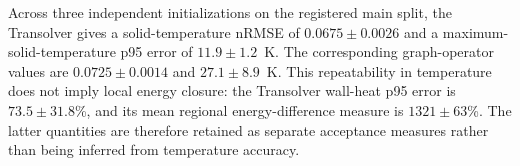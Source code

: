 Across three independent initializations on the registered main split, the 
Transolver gives a solid-temperature nRMSE of $0.0675 \pm 0.0026$ and a maximum-solid-temperature p95 error of $11.9 \pm 1.2$~K.  The corresponding graph-operator values are $0.0725 \pm 0.0014$ and $27.1 \pm 8.9$~K.
This repeatability in temperature does not imply local energy closure: the Transolver wall-heat p95 error is $73.5 \pm 31.8$\%, and its mean regional energy-difference measure is $1321 \pm 63$\%.  The latter quantities are therefore retained as separate acceptance measures rather than being inferred from temperature accuracy.
